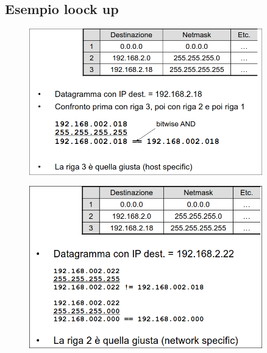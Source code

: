 \documentclass{report}
\begin{document}
                \subsection{Esempio loock up}
                     \begin{figure}[H]
                        \includegraphics[width=0.9\textwidth]{1/es1.png}
                    \end{figure}
                    \begin{figure}[H]
                        \includegraphics[width=0.9\textwidth]{1/es2.png}
                    \end{figure}
\end{document}
